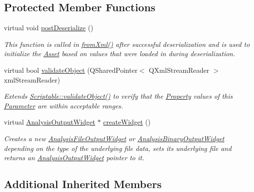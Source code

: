 \subsection*{Protected Member Functions}
\begin{DoxyCompactItemize}
\item 
virtual void \hyperlink{class_picto_1_1_analysis_file_output_a1f03bef9d6e5395471475d685f1e918c}{post\-Deserialize} ()
\begin{DoxyCompactList}\small\item\em This function is called in \hyperlink{class_picto_1_1_asset_a8bed4da09ecb1c07ce0dab313a9aba67}{from\-Xml()} after successful deserialization and is used to initialize the \hyperlink{class_picto_1_1_asset}{Asset} based on values that were loaded in during deserialization. \end{DoxyCompactList}\item 
virtual bool \hyperlink{class_picto_1_1_analysis_file_output_a5a892bff91012d5818e0cfcfae485242}{validate\-Object} (Q\-Shared\-Pointer$<$ Q\-Xml\-Stream\-Reader $>$ xml\-Stream\-Reader)
\begin{DoxyCompactList}\small\item\em Extends \hyperlink{class_picto_1_1_scriptable_ab6e2944c43a3b5d418bf7b251594386d}{Scriptable\-::validate\-Object()} to verify that the \hyperlink{class_picto_1_1_property}{Property} values of this \hyperlink{class_picto_1_1_parameter}{Parameter} are within acceptable ranges. \end{DoxyCompactList}\item 
virtual \hyperlink{class_picto_1_1_analysis_output_widget}{Analysis\-Output\-Widget} $\ast$ \hyperlink{class_picto_1_1_analysis_file_output_a8343710e6b67612ed0d44dc3c97fc01f}{create\-Widget} ()
\begin{DoxyCompactList}\small\item\em Creates a new \hyperlink{class_picto_1_1_analysis_file_output_widget}{Analysis\-File\-Output\-Widget} or \hyperlink{class_picto_1_1_analysis_binary_output_widget}{Analysis\-Binary\-Output\-Widget} depending on the type of the underlying file data, sets its underlying file and returns an \hyperlink{class_picto_1_1_analysis_output_widget}{Analysis\-Output\-Widget} pointer to it. \end{DoxyCompactList}\end{DoxyCompactItemize}
\subsection*{Additional Inherited Members}


